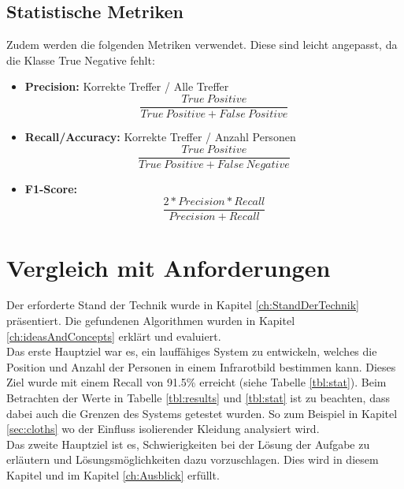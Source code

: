 \subsection{Statistische Metriken}
\noindent Zudem werden die folgenden Metriken verwendet. Diese sind leicht angepasst, da die Klasse True Negative fehlt:

\begin{itemize}
	\item \textbf{Precision:} Korrekte Treffer / Alle Treffer\[\dfrac{True\: Positive}{True\: Positive + False\: Positive}\]
	\item \textbf{Recall/Accuracy:} Korrekte Treffer / Anzahl Personen\[\dfrac{True\: Positive}{True\: Positive + False\: Negative}\]
	\item \textbf{F1-Score:} \[\dfrac{2*Precision*Recall}{Precision + Recall}\]
\end{itemize}


\section{Vergleich mit Anforderungen}
\label{sec:VergleichAnforderungen}

Der erforderte Stand der Technik wurde in Kapitel \ref{ch:StandDerTechnik} präsentiert. Die gefundenen Algorithmen wurden in Kapitel \ref{ch:ideasAndConcepts} erklärt und evaluiert.\\
Das erste Hauptziel war es, ein lauffähiges System zu entwickeln, welches die Position und Anzahl der Personen in einem Infrarotbild bestimmen kann. Dieses Ziel wurde mit einem Recall von 91.5\%  erreicht (siehe Tabelle \ref{tbl:stat}). Beim Betrachten der Werte in Tabelle \ref{tbl:results} und \ref{tbl:stat} ist zu beachten, dass dabei auch die Grenzen des Systems getestet wurden. So zum Beispiel in Kapitel \ref{sec:cloths} wo der Einfluss isolierender Kleidung analysiert wird.\\
Das zweite Hauptziel ist es, Schwierigkeiten bei der Lösung der Aufgabe zu erläutern und Lösungsmöglichkeiten dazu vorzuschlagen. Dies wird in diesem Kapitel und im Kapitel \ref{ch:Ausblick} erfüllt.

